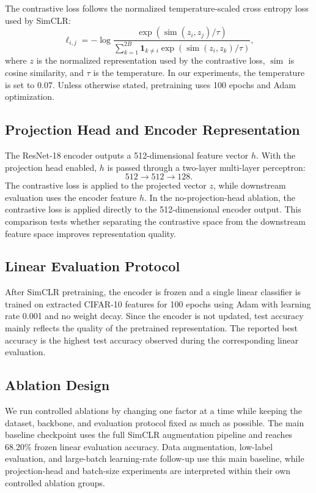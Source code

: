 \documentclass[10pt]{article}
\begin{document}
The contrastive loss follows the normalized temperature-scaled cross entropy loss used by SimCLR:
\[
\ell_{i,j} =
-\log
\frac{\exp(\operatorname{sim}(z_i,z_j)/\tau)}
{\sum_{k=1}^{2B} \mathbf{1}_{k \ne i}
\exp(\operatorname{sim}(z_i,z_k)/\tau)} ,
\]
where $z$ is the normalized representation used by the contrastive loss, $\operatorname{sim}$ is cosine similarity, and $\tau$ is the temperature. In our experiments, the temperature is set to 0.07. Unless otherwise stated, pretraining uses 100 epochs and Adam optimization.

\subsection{Projection Head and Encoder Representation}

The ResNet-18 encoder outputs a 512-dimensional feature vector $h$. With the projection head enabled, $h$ is passed through a two-layer multi-layer perceptron:
\[
512 \rightarrow 512 \rightarrow 128.
\]
The contrastive loss is applied to the projected vector $z$, while downstream evaluation uses the encoder feature $h$. In the no-projection-head ablation, the contrastive loss is applied directly to the 512-dimensional encoder output. This comparison tests whether separating the contrastive space from the downstream feature space improves representation quality.

\subsection{Linear Evaluation Protocol}

After SimCLR pretraining, the encoder is frozen and a single linear classifier is trained on extracted CIFAR-10 features for 100 epochs using Adam with learning rate 0.001 and no weight decay. Since the encoder is not updated, test accuracy mainly reflects the quality of the pretrained representation. The reported best accuracy is the highest test accuracy observed during the corresponding linear evaluation.

\subsection{Ablation Design}

We run controlled ablations by changing one factor at a time while keeping the dataset, backbone, and evaluation protocol fixed as much as possible. The main baseline checkpoint uses the full SimCLR augmentation pipeline and reaches 68.20\% frozen linear evaluation accuracy. Data augmentation, low-label evaluation, and large-batch learning-rate follow-up use this main baseline, while projection-head and batch-size experiments are interpreted within their own controlled ablation groups.
\end{document}
